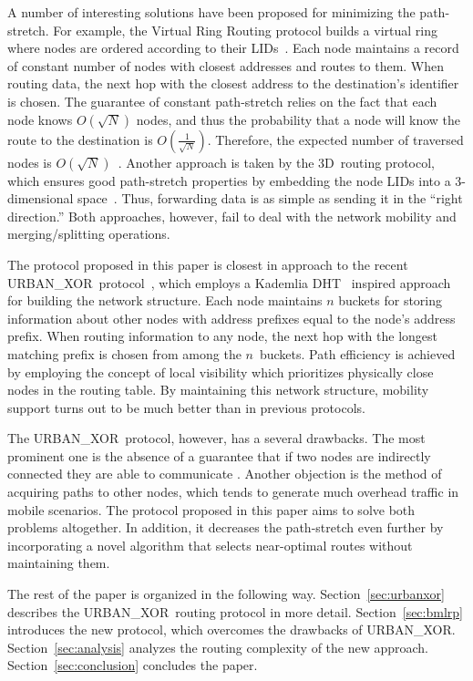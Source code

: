 \documentclass[conference]{IEEEtran}
\theoremstyle{definition}
\newcommand{\urbanxor}{URBAN\_XOR}
\begin{document}
A number of interesting solutions have been proposed for minimizing the path-stretch. For example, the Virtual Ring Routing protocol builds a virtual ring where nodes are ordered according to their LIDs~\cite{VRR}. Each node maintains a record of constant number of nodes with closest addresses and routes to them. When routing data, the next hop with the closest address to the destination's identifier is chosen. The guarantee of constant path-stretch relies on the fact that each node knows $O(\sqrt{N})$ nodes, and thus the probability that a node will know the route to the destination is $O(\frac{1}{\sqrt{N}})$. Therefore, the expected number of traversed nodes is $O(\sqrt{N})$~\cite{VRR}. Another approach is taken by the 3D~routing protocol, which ensures good path-stretch properties by embedding the
node LIDs into a 3-dimensional space~\cite{3drp}. Thus, forwarding data is as simple as sending it in the ``right direction.'' Both approaches, however, fail to deal with the network mobility and merging/splitting operations. 

The protocol proposed in this paper is closest in approach to the recent
\urbanxor\ protocol~\cite{Pasquini}, which employs a Kademlia DHT~\cite{kademlia} inspired approach for building the network structure. Each node maintains $n$ buckets for storing information about other nodes with address prefixes equal to the node's address prefix. When routing information to any node, the next hop with the longest matching prefix is chosen from among the $n$~buckets. Path efficiency is achieved by employing the concept of local visibility which prioritizes physically close nodes in the routing table. By maintaining this network structure, mobility support turns out to be much better than in previous protocols.

The \urbanxor\ protocol, however, has a several drawbacks. The most prominent one is the absence of a guarantee that if two nodes are indirectly connected they are able to communicate \cite{Pasquini}. Another objection is the method of acquiring paths to other nodes, which tends to generate much overhead traffic in mobile scenarios. The protocol proposed in this paper aims to solve both problems altogether. In addition, it decreases the path-stretch even further by incorporating a novel algorithm that selects near-optimal routes without maintaining them.

The rest of the paper is organized in the following way. Section~\ref{sec:urbanxor} describes the \urbanxor\ routing protocol in more detail. Section~\ref{sec:bmlrp} introduces the new protocol, which overcomes the drawbacks of \urbanxor. 
Section~\ref{sec:analysis} analyzes the routing complexity of the new approach. 
Section~\ref{sec:conclusion} concludes the paper.
\end{document}
